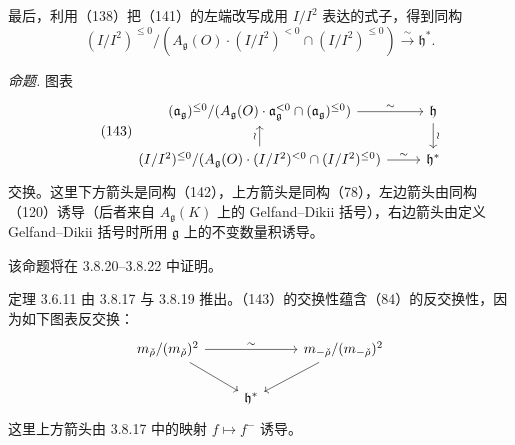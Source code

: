 最后，利用（138）把（141）的左端改写成用 $I/I^{2}$ 表达的式子，得到同构
\begin{equation}\tag{142}
  (I/I^{2})^{\le 0}/(A_{\mathfrak{g}}(O)\cdot(I/I^{2})^{<0}\cap(I/I^{2})^{\le 0})\xrightarrow{\sim}\mathfrak{h}^{*}.
\end{equation}

 \emph{命题.} 图表
\begin{equation}\tag{143}
\begin{tikzcd}[row sep=1.5em]
  (\mathfrak{a}_{\mathfrak{g}})^{\le 0}/(A_{\mathfrak{g}}(O)\cdot\mathfrak{a}_{\mathfrak{g}}^{<0}\cap(\mathfrak{a}_{\mathfrak{g}})^{\le 0})
    \arrow[r, "\sim"] & \mathfrak{h} \arrow[d, "\wr"] \\
  (I/I^{2})^{\le 0}/(A_{\mathfrak{g}}(O)\cdot(I/I^{2})^{<0}\cap(I/I^{2})^{\le 0})
    \arrow[r, "\sim"] \arrow[u, "\wr"] & \mathfrak{h}^{*}
\end{tikzcd}
\end{equation}
交换。这里下方箭头是同构（142），上方箭头是同构（78），左边箭头由同构（120）诱导（后者来自 $A_{\mathfrak{g}}(K)$ 上的 Gelfand--Dikii 括号），右边箭头由定义 Gelfand--Dikii 括号时所用 $\mathfrak{g}$ 上的不变数量积诱导。

该命题将在 3.8.20--3.8.22 中证明。

定理 3.6.11 由 3.8.17 与 3.8.19 推出。（143）的交换性蕴含（84）的反交换性，因为如下图表反交换：
\[
\begin{tikzcd}
  m_{\check\rho}/(m_{\check\rho})^{2} \arrow[rr, "\sim"] \arrow[dr] & & m_{-\check\rho}/(m_{-\check\rho})^{2} \arrow[dl] \\
  & \mathfrak{h}^{*} &
\end{tikzcd}
\]
这里上方箭头由 3.8.17 中的映射 $f\mapsto f^{-}$ 诱导。

